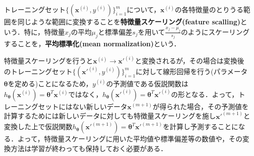 \begin{defi}[特徴量スケーリング]
トレーニングセット$\{({\bm x}^{(i)},y^{(i)})\}_{i=1}^m$について，${\bm x}^{(i)}$の各特徴量のとりうる範囲を同じような範囲に変換することを{\bf 特徴量スケーリング(feature scalling)}という．特に，特徴量$x_j$の平均$\mu_j$と標準偏差$s_j$を用いて$\frac{x_j-\mu_j}{s_j}$のようにスケーリングすることを，{\bf 平均標準化(mean normalization)}という．
\end{defi}

\begin{rem}
特徴量スケーリングを行うと${\bm x}^{(i)}\to {\bm x}'^{(i)}$と変換されるが，その場合は変換後のトレーニングセット$\{({\bm x}'^{(i)},y^{(i)})\}_{i=1}^m$に対して線形回帰を行う(パラメータ${\bm \theta}$を定める)ことになるため，$y^{(i)}$の予測値である仮説関数は$h_{{\bm \theta}}({\bm x}^{(i)})={\bm \theta}^T{\bm x}^{(i)}$ではなく，$h_{{\bm \theta}}({\bm x}'^{(i)})={\bm \theta}^T{\bm x}'^{(i)}$の形となる．よって，トレーニングセットにはない新しいデータ${\bm x}^{(m+1)}$が得られた場合，その予測値を計算するためには新しいデータに対しても特徴量スケーリングを施し${\bm x}'^{(m+1)}$と変換した上で仮説関数$h_{{\bm \theta}}({\bm x}'^{(m+1)})={\bm \theta}^T{\bm x}'^{(m+1)}$を計算し予測することになる．よって，特徴量スケーリングに用いた平均値や標準偏差等の数値や，その変換方法は学習が終わっても保持しておく必要がある．
\end{rem}

